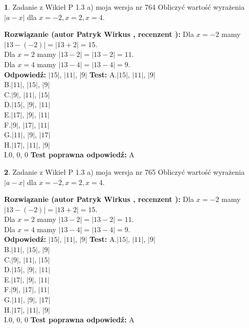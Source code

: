 \documentclass[12pt, a4paper]{article}
\theoremstyle{definition} %
\newtheorem{zad}{}
\newcommand{\zadStart}[1]{\begin{zad}#1\newline}
\newcommand{\zadStop}{\end{zad}}
\newcommand{\rozwStart}[2]{\noindent \textbf{Rozwiązanie (autor #1 , recenzent #2): }\newline}
\newcommand{\rozwStop}{\newline}
\newcommand{\odpStart}{\noindent \textbf{Odpowiedź:}\newline}
\newcommand{\odpStop}{\newline}
\newcommand{\testStart}{\noindent \textbf{Test:}\newline}
\newcommand{\testStop}{\newline}
\newcommand{\kluczStart}{\noindent \textbf{Test poprawna odpowiedź:}\newline}
\newcommand{\kluczStop}{\newline}
\begin{document}
\zadStart{Zadanie z Wikieł P 1.3 a) moja wersja nr 764}
Obliczyć wartość wyrażenia $|a - x|$ dla $x=-2,x=2,x=4$.
\zadStop
\rozwStart{Patryk Wirkus}{}
Dla $x = -2$ mamy $|13 - (-2)| = |13 + 2| = 15$.\\
Dla $x = 2$ mamy $|13 - 2| = |13 - 2| = 11$.\\
Dla $x = 4$ mamy $|13 - 4| = |13 - 4| = 9$.\\
\rozwStop
\odpStart
$|15|$, $|11|$, $|9|$
\odpStop
\testStart
A.$|15|$, $|11|$, $|9|$\\
B.$|11|$, $|15|$, $|9|$\\
C.$|9|$, $|11|$, $|15|$\\
D.$|15|$, $|9|$, $|11|$\\
E.$|17|$, $|9|$, $|11|$\\
F.$|9|$, $|17|$, $|11|$\\
G.$|11|$, $|9|$, $|17|$\\
H.$|17|$, $|11|$, $|9|$\\
I.$0$, $0$, $0$
\testStop
\kluczStart
A
\kluczStop



\zadStart{Zadanie z Wikieł P 1.3 a) moja wersja nr 765}
Obliczyć wartość wyrażenia $|a - x|$ dla $x=-2,x=2,x=4$.
\zadStop
\rozwStart{Patryk Wirkus}{}
Dla $x = -2$ mamy $|13 - (-2)| = |13 + 2| = 15$.\\
Dla $x = 2$ mamy $|13 - 2| = |13 - 2| = 11$.\\
Dla $x = 4$ mamy $|13 - 4| = |13 - 4| = 9$.\\
\rozwStop
\odpStart
$|15|$, $|11|$, $|9|$
\odpStop
\testStart
A.$|15|$, $|11|$, $|9|$\\
B.$|11|$, $|15|$, $|9|$\\
C.$|9|$, $|11|$, $|15|$\\
D.$|15|$, $|9|$, $|11|$\\
E.$|17|$, $|9|$, $|11|$\\
F.$|9|$, $|17|$, $|11|$\\
G.$|11|$, $|9|$, $|17|$\\
H.$|17|$, $|11|$, $|9|$\\
I.$0$, $0$, $0$
\testStop
\kluczStart
A
\kluczStop
\end{document}
